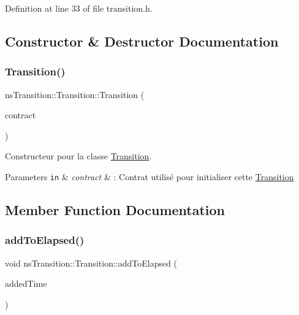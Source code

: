 Definition at line 33 of file transition.\+h.



\subsection{Constructor \& Destructor Documentation}
\mbox{\label{classns_transition_1_1_transition_a7c3e692c43aceca5e4f716f3ae22bf05}} 
\subsubsection{\texorpdfstring{Transition()}{Transition()}}
{\footnotesize\ttfamily ns\+Transition\+::\+Transition\+::\+Transition (\begin{DoxyParamCaption}\item[{const \hyperlink{classns_transition_1_1_transition_contract}{Transition\+Contract} \&}]{contract }\end{DoxyParamCaption})}



Constructeur pour la classe \hyperlink{classns_transition_1_1_transition}{Transition}. 


\begin{DoxyParams}[1]{Parameters}
\mbox{\tt in}  & {\em contract} & \+: Contrat utilisé pour initialiser cette \hyperlink{classns_transition_1_1_transition}{Transition} \\
\hline
\end{DoxyParams}


\subsection{Member Function Documentation}
\mbox{\label{classns_transition_1_1_transition_abb421b44828c7b6dec60a0256a97b3d9}} 
\subsubsection{\texorpdfstring{add\+To\+Elapsed()}{addToElapsed()}}
{\footnotesize\ttfamily void ns\+Transition\+::\+Transition\+::add\+To\+Elapsed (\begin{DoxyParamCaption}\item[{const \hyperlink{namespacens_transition_a260258f249f46ff9a62da721537f87af}{System\+Duration\+\_\+t} \&}]{added\+Time }\end{DoxyParamCaption})}



